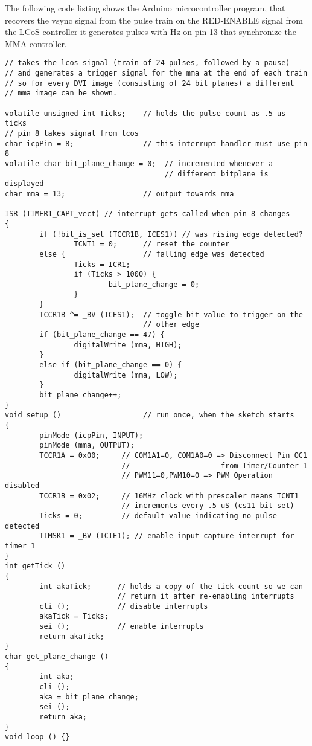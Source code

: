 The following code listing shows the Arduino microcontroller program,
that recovers the vsync signal from the pulse train on the
\textsf{RED-ENABLE} signal from the LCoS controller it generates pulses
with \unit[60]{Hz} on pin 13 that synchronize the MMA controller.
{\small\label{fig:arduino-vsync}
\begin{verbatim}
// takes the lcos signal (train of 24 pulses, followed by a pause)
// and generates a trigger signal for the mma at the end of each train
// so for every DVI image (consisting of 24 bit planes) a different
// mma image can be shown. 

volatile unsigned int Ticks;    // holds the pulse count as .5 us ticks
// pin 8 takes signal from lcos
char icpPin = 8;                // this interrupt handler must use pin 8
volatile char bit_plane_change = 0;  // incremented whenever a 
                                     // different bitplane is displayed
char mma = 13;                  // output towards mma

ISR (TIMER1_CAPT_vect) // interrupt gets called when pin 8 changes
{
        if (!bit_is_set (TCCR1B, ICES1)) // was rising edge detected?
                TCNT1 = 0;      // reset the counter
        else {                  // falling edge was detected
                Ticks = ICR1;
                if (Ticks > 1000) {
                        bit_plane_change = 0;
                }
        }
        TCCR1B ^= _BV (ICES1);  // toggle bit value to trigger on the
                                // other edge
        if (bit_plane_change == 47) {
                digitalWrite (mma, HIGH);
        }
        else if (bit_plane_change == 0) {
                digitalWrite (mma, LOW);
        }
        bit_plane_change++;
}
void setup ()                   // run once, when the sketch starts
{
        pinMode (icpPin, INPUT);
        pinMode (mma, OUTPUT);
        TCCR1A = 0x00;     // COM1A1=0, COM1A0=0 => Disconnect Pin OC1
                           //                     from Timer/Counter 1
                           // PWM11=0,PWM10=0 => PWM Operation disabled
        TCCR1B = 0x02;     // 16MHz clock with prescaler means TCNT1
                           // increments every .5 uS (cs11 bit set)
        Ticks = 0;         // default value indicating no pulse detected
        TIMSK1 = _BV (ICIE1); // enable input capture interrupt for timer 1
}
int getTick ()
{
        int akaTick;      // holds a copy of the tick count so we can
                          // return it after re-enabling interrupts
        cli ();           // disable interrupts
        akaTick = Ticks;
        sei ();           // enable interrupts
        return akaTick;
}
char get_plane_change ()
{
        int aka;
        cli ();
        aka = bit_plane_change;
        sei ();
        return aka;
}
void loop () {}                 
\end{verbatim}
}

